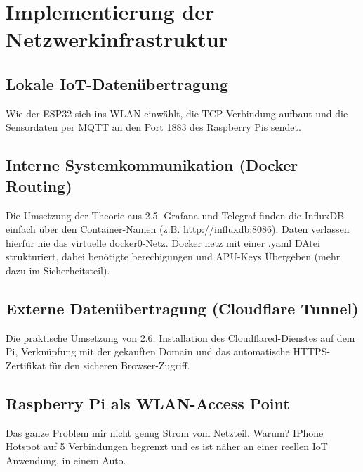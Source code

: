 
\chapter{Implementierung der Netzwerkinfrastruktur}

\section{Lokale IoT-Datenübertragung}
Wie der ESP32 sich ins WLAN einwählt, die TCP-Verbindung aufbaut und die Sensordaten per MQTT an den Port 1883 des Raspberry Pis sendet.

\section{Interne Systemkommunikation (Docker Routing)}
Die Umsetzung der Theorie aus 2.5. Grafana und Telegraf finden die InfluxDB einfach über den Container-Namen (z.B. http://influxdb:8086). Daten verlassen hierfür nie das virtuelle docker0-Netz. Docker netz mit einer .yaml DAtei strukturiert, dabei benötigte berechigungen und APU-Keys Übergeben (mehr dazu im Sicherheitsteil).

\section{Externe Datenübertragung (Cloudflare Tunnel)}
Die praktische Umsetzung von 2.6. Installation des Cloudflared-Dienstes auf dem Pi, Verknüpfung mit der gekauften Domain und das automatische HTTPS-Zertifikat für den sicheren Browser-Zugriff.

\section{Raspberry Pi als WLAN-Access Point}
Das ganze Problem mir nicht genug Strom vom Netzteil. Warum? IPhone Hotspot auf 5 Verbindungen begrenzt und es ist näher an einer reellen IoT Anwendung, in einem Auto.

